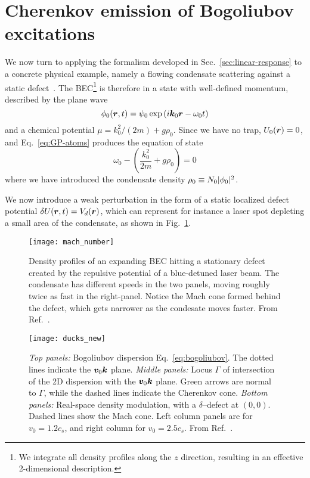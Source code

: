 \section{Cherenkov emission of Bogoliubov excitations}
\label{sec:cherenkov-emission}


We now turn to applying the formalism developed in
Sec.~\ref{sec:linear-response} to a concrete physical example, namely
a flowing condensate scattering against a static
defect~\cite{Carusotto_2006}. The BEC\footnote{We integrate all
  density profiles along the $z$ direction, resulting in an effective
  2-dimensional description.} is therefore in a state with
well-defined momentum, described by the plane wave
%
\begin{equation}\label{eq:atom-initial}
  \phi_0(\bm{r}, t) = \psi_0 \exp \left( i \bm{k}_0 \bm{r} - \omega_0 t \right)
\end{equation}
% 
and a chemical potential $\mu = k_0^2/(2m) + g \rho_0$. Since we have
no trap, $U_0(\bm{r})=0$, and Eq.~\eqref{eq:GP-atoms} produces the
equation of state
%
\begin{equation}\label{eq:atom-MF}
  \omega_0 - \left( \frac{k_0^2}{2m} + g \rho_0 \right) = 0
\end{equation}
% 
where we have introduced the condensate density
$\rho_0 \equiv N_0 \vert \phi_0 \vert^2$. 

We now introduce a weak perturbation in the form of a static localized
defect potential $\delta U(\bm{r}, t) = V_d(\bm{r})$, which can represent
for instance a laser spot depleting a small area of the condensate, as
shown in Fig.~\ref{fig:mach-number}.
%
\begin{figure}[tb]\centering
  \texttt{[image: mach\_number]}
  \caption{
    Density profiles of an expanding BEC hitting a stationary defect
created by the repulsive potential of a blue-detuned laser beam. The
condensate has different speeds in the two panels, moving roughly
twice as fast in the right-panel. Notice the Mach cone formed behind
the defect, which gets narrower as the condesate moves faster. From
Ref.~\cite{Carusotto_2006}.
}\label{fig:mach-number}
\end{figure}
% 
\begin{figure}[tb]\centering
  \texttt{[image: ducks\_new]}
  \caption{
    \emph{Top panels:} Bogoliubov dispersion
Eq.~\eqref{eq:bogoliubov}. The dotted lines indicate the $\bm{v}_0
\bm{k}$ plane.
    \emph{Middle panels:} Locus $\Gamma$ of intersection of the 2D
dispersion with the $\bm{v}_0 \bm{k}$ plane. Green arrows are normal
to $\Gamma$, while the dashed lines indicate the Cherenkov
cone.
    \emph{Bottom panels:} Real-space density modulation, with a
$\delta$--defect at $(0,0)$. Dashed lines show the Mach cone. Left
column panels are for $v_0 = 1.2 c_s$, and right column for $v_0 = 2.5
c_s$. From Ref.~\cite{9783319002651}.
}\label{fig:bogo-cherenkov}
\end{figure}

